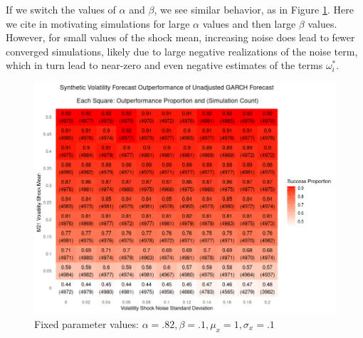 \documentclass[11pt,3p,review,authoryear]{elsarticle}
\theoremstyle{definition}
\begin{document}
If we switch the values of $\alpha$ and $\beta$, we see similar behavior, as in Figure \ref{fig:heavy_alpha}.  Here we cite \citet[p. 22]{francq2019garch} in motivating simulations for large $\alpha$ values and then large $\beta$ values.  However, for small values of the shock mean, increasing noise does lead to fewer converged simulations, likely due to large negative realizations of the noise term, which in turn lead to near-zero and even negative estimates of the terms $\omega_{i}^{*}$.
\begin{figure}[h!]
  \begin{center}
    \includegraphics[scale=.45]{simulation_plots/standard_simulation_alpha_.82_beta_.1.png}
    \caption{Fixed parameter values: $\alpha = .82, \beta = .1, \mu_{x} = 1, \sigma_{x} = .1$}
    \label{fig:heavy_alpha}
  \end{center}
  \end{figure}

\end{document}
